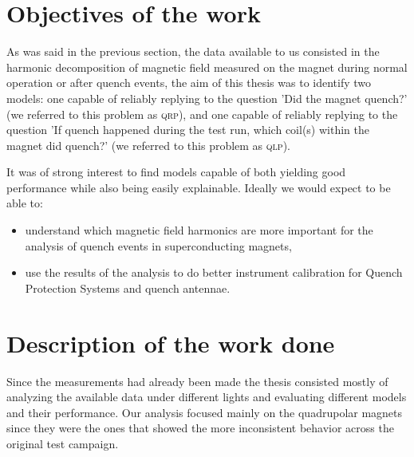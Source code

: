 \documentclass[a4paper, notitlepage]{article}
\begin{document}
\section{Objectives of the work}
As was said in the previous section, the data available to us consisted in the harmonic
decomposition of magnetic field measured on the magnet during normal operation or after quench
events, the aim of this thesis was to identify two models: one capable of reliably
replying to the question 'Did the magnet quench?' (we referred to this problem as \textsc{qrp}), and
one capable of reliably replying to the question 'If quench happened during the test run, which
coil(s) within the magnet did quench?' (we referred to this problem as \textsc{qlp}).

It was of strong interest to find models capable of both yielding good performance while also being
easily explainable. Ideally we would expect to be able to:
\begin{itemize}
	\item understand which magnetic field harmonics are more important for the analysis of
	      quench events in superconducting magnets,
	\item use the results of the analysis to do better instrument calibration for Quench
	      Protection Systems and quench antennae.
\end{itemize}

\section{Description of the work done}
Since the measurements had already been made the thesis consisted mostly of analyzing the available
data under different lights and evaluating different models and their performance. Our analysis
focused mainly on the quadrupolar magnets since they were the ones that showed the more inconsistent behavior across the original test campaign.

\end{document}
